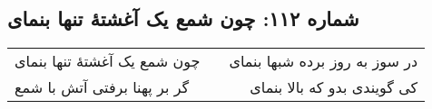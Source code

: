 \begin{center}
\section*{شماره ۱۱۲: چون شمع یک آغشتۀ تنها بنمای}
\label{sec:112}
\begin{longtable}{l p{0.5cm} r}
چون شمع یک آغشتهٔ تنها بنمای
&&
در سوز به روز برده شبها بنمای
\\
گر بر پهنا برفتی آتش با شمع
&&
کی گویندی بدو که بالا بنمای
\\
\end{longtable}
\end{center}
